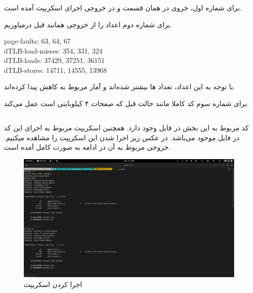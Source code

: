 \documentclass{article}
\begin{document}
\subsubsection{}
برای شماره اول، خروی 
در همان قسمت و در خروجی اجرای اسکریپت آمده است. 

برای شماره دوم اعداد را از خروجی همانند قبل درمیاوریم.
\begin{latin}
page-faults: 63, 64, 67 \\
dTLB-load-misses: 354, 331, 324 \\
dTLB-loads: 37429, 37251, 36151 \\
dTLB-stores: 14711, 14555, 13968
\end{latin}
با توجه به این اعداد،‌ تعداد 
ها
بیشتر شده‌اند و آمار مربوط به 
کاهش پیدا کرده‌اند. 

برای شماره سوم کد کاملا مانند حالت قبل که صفحات ۴ کیلوبایتی است 
عمل می‌کند. 
\subsection{}
\subsubsection{}
کد مربوط به این بخش در فایل 
وجود دارد. همچنین اسکریپت مربوط به اجرای این کد در فایل 
موجود می‌باشد. در عکس زیر اجرا شدن این اسکریپت را مشاهده میکنیم. خروجی مربوط 
به آن در ادامه به صورت کامل آمده است. 

\begin{figure}[H]
   \centering
   \includegraphics[width=\linewidth]{1.2.png}
   \caption{اجرا کردن اسکریپت}
\end{figure}
\end{document}

